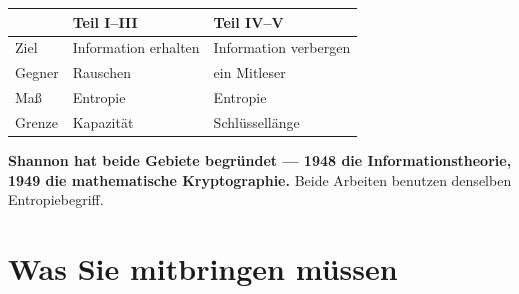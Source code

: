 \begin{merksatz}
\begin{center}
{\small
\renewcommand{\arraystretch}{1.52}
\begin{tabular}{@{}P{2.4cm}P{2.8cm}P{2.8cm}@{}}
\toprule
& \textbf{Teil I--III} & \textbf{Teil IV--V}\\
\midrule
Ziel & Information erhalten & Information verbergen\\
Gegner & Rauschen & ein Mitleser\\
Maß & Entropie & Entropie\\
Grenze & Kapazität & Schlüssellänge\\
\bottomrule
\end{tabular}}
\end{center}

\begin{center}
\begin{minipage}{0.9\textwidth}
\textbf{Shannon hat beide Gebiete begründet --- 1948 die Informationstheorie, 1949 die mathematische Kryptographie.} Beide Arbeiten benutzen denselben Entropiebegriff.
\end{minipage}
\end{center}

\begin{center}
\begin{minipage}{0.88\textwidth}
\end{minipage}
\end{center}
\end{merksatz}

\section*{Was Sie mitbringen müssen}

